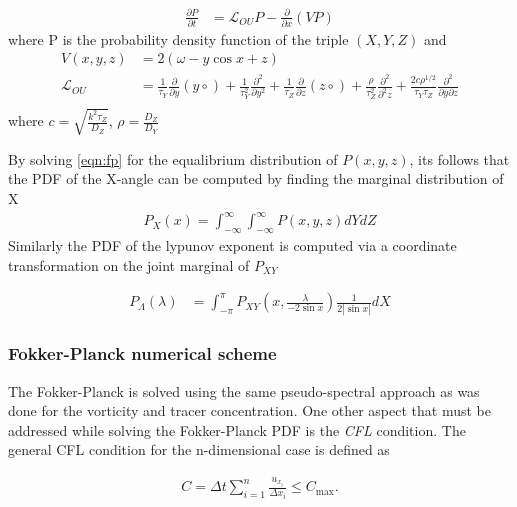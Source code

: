 \begin{align}
 \label{eqn:fp}
 \frac{\partial P}{\partial t} &= \mathcal{L}_{OU}P - \frac{\partial}{\partial x}(VP) 
\end{align}
where P is the probability density function of the triple $(X,Y,Z)$ and 
\begin{align*}
  V(x,y,z) &= 2(\omega - y \cos x + z) \\
 \mathcal{L}_{OU} &= \frac{1}{\tau_{Y}} \frac{\partial}{\partial y}(y \circ) + \frac{1}{\tau^{2}_{Y}} \frac{\partial^{2}}{\partial y^{2}} + \frac{1}{\tau_{Z}} \frac{\partial}{\partial z}(z \circ)+ \frac{\rho}{\tau^{2}_{Z}} \frac{\partial^{2}}{\partial^{2} z} + \frac{2c\rho^{1/2}}{\tau_{Y}\tau_{Z}} \frac{\partial^{2}}{\partial y \partial z}\\
\end{align*}
where $c = \sqrt{\frac{k^{2}\tau_{Z}}{D_{Z}}}$, $\rho=\frac{D_{Z}}{D_{Y}}$

By solving \ref{eqn:fp} for the equalibrium distribution of $P(x,y,z)$, its follows that the PDF of the X-angle can be computed by finding the marginal distribution of X
\begin{align}
  \label{eqn:x-marginal}
  P_{X}(x) = \int_{-\infty}^{\infty} \int_{-\infty}^{\infty} P(x,y,z) dY dZ 
\end{align}
Similarly the PDF of the lypunov exponent is computed via a coordinate transformation on the joint marginal of $P_{XY}$

\begin{align}
  \label{eqn:lambda-marginal}
  P_{\Lambda}(\lambda) &= \int_{-\pi}^{\pi} P_{XY}\left(x,\frac{\lambda}{-2 \sin x}\right)\frac{1}{2|\sin x|}dX 
\end{align}

\subsubsection{Fokker-Planck numerical scheme}\label{sec:der-sub-fp}
The Fokker-Planck is solved using the same pseudo-spectral approach as was done for the vorticity and tracer concentration. One other aspect that must be addressed while solving the Fokker-Planck PDF is the \textit{CFL} condition.  
The general CFL condition for the n-dimensional case is defined as

\begin{align*}
  C=\Delta t\sum _{{i=1}}^{n}{\frac  {u_{{x_{i}}}}{\Delta x_{i}}}\leq C_{\max }.
\end{align*}

